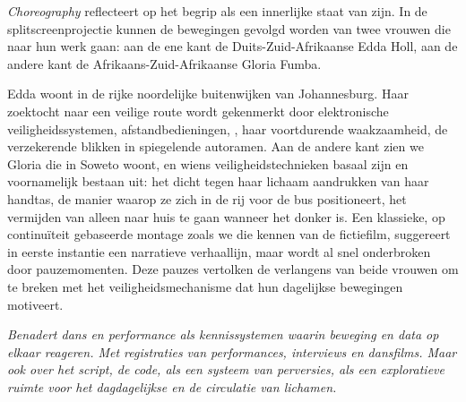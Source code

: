 {{

{\em Choreography} reflecteert op het begrip {\em {}} als een innerlijke staat van zijn. In de
splitscreenprojectie kunnen de bewegingen gevolgd worden van twee
vrouwen die naar hun werk gaan: aan de ene kant de
Duits{}-Zuid{}-Afrikaanse Edda Holl, aan de andere kant de
Afrikaans{}-Zuid{}-Afrikaanse Gloria Fumba.

Edda woont in de rijke noordelijke buitenwijken van Johannesburg. Haar
zoektocht naar een veilige route wordt gekenmerkt door elektronische
veiligheidssystemen, afstandbedieningen, , haar
voortdurende waakzaamheid, de verzekerende blikken in spiegelende
autoramen. Aan de andere kant zien we Gloria die in Soweto woont, en
wiens veiligheidstechnieken basaal zijn en voornamelijk bestaan uit:
het dicht tegen haar lichaam aandrukken van haar handtas, de manier
waarop ze zich in de rij voor de bus positioneert, het vermijden van
alleen naar huis te gaan wanneer het donker is. Een klassieke, op
continu\"iteit gebaseerde montage zoals we die kennen van de
fictiefilm, suggereert in eerste instantie een narratieve verhaallijn,
maar wordt al snel onderbroken door pauzemomenten. Deze pauzes
vertolken de verlangens van beide vrouwen om te breken met het
veiligheidsmechanisme dat hun dagelijkse bewegingen motiveert.
\blank
{}\par
}

{\em Benadert dans en performance als kennissystemen waarin beweging en data
op elkaar reageren. Met registraties van performances, interviews en
dansfilms. Maar ook over het script, de code, als een systeem van
perversies, als een exploratieve ruimte voor het dagdagelijkse en de
circulatie van lichamen.}

}
